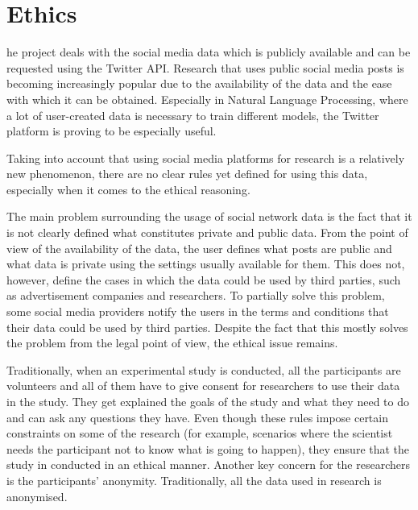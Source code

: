 \let\textcircled=\pgftextcircled
\chapter{Ethics}
\label{chap:ethics}

he project deals with the social media data which is publicly available and can be requested using the Twitter API. Research that uses public social media posts is becoming increasingly popular due to the availability of the data and the ease with which it can be obtained. Especially in Natural Language Processing, where a lot of user-created data is necessary to train different models, the Twitter platform is proving to be especially useful. 

Taking into account that using social media platforms for research is a relatively new phenomenon, there are no clear rules yet defined for using this data, especially when it comes to the ethical reasoning. 

The main problem surrounding the usage of social network data is the fact that it is not clearly defined what constitutes private and public data. From the point of view of the availability of the data, the user defines what posts are public and what data is private using the settings usually available for them. This does not, however, define the cases in which the data could be used by third parties, such as advertisement companies and researchers. To partially solve this problem, some social media providers notify the users in the terms and conditions that their data could be used by third parties. Despite the fact that this mostly solves the problem from the legal point of view, the ethical issue remains. 

Traditionally, when an experimental study is conducted, all the participants are volunteers and all of them have to give consent for researchers to use their data in the study. They get explained the goals of the study and what they need to do and can ask any questions they have. Even though these rules impose certain constraints on some of the research (for example, scenarios where the scientist needs the participant not to know what is going to happen), they ensure that the study in conducted in an ethical manner. Another key concern for the researchers is the participants' anonymity. Traditionally, all the data used in research is anonymised. 

